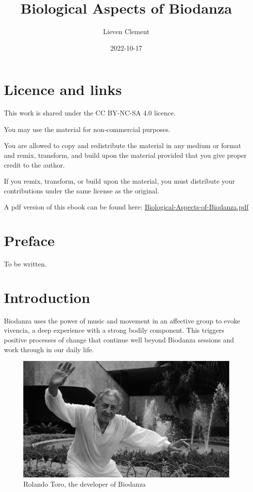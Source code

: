 \documentclass[
  11pt,
]{book}
\title{Biological Aspects of Biodanza}
\author{Lieven Clement}
\date{2022-10-17}
\begin{document}
\maketitle

{
\hypersetup{linkcolor=}
\setcounter{tocdepth}{2}
\tableofcontents
}
\hypertarget{licence-and-links}{%
\chapter*{Licence and links}\label{licence-and-links}}

This work is shared under the
CC BY-NC-SA 4.0 licence.

You may use the material for non-commercial purposes.

You are allowed to copy and redistribute the material in any medium or format and remix, transform, and build upon the material provided that you give proper credit to the author.

If you remix, transform, or build upon the material, you must distribute your contributions under the same license as the original.

A pdf version of this ebook can be found here: \href{https://biodanzabrugge.be/biologicalAspectsBiodanza/Biological-Aspects-of-Biodanza.pdf}{Biological-Aspects-of-Biodanza.pdf}

\hypertarget{preface}{%
\chapter*{Preface}\label{preface}}

To be written.

\hypertarget{intro}{%
\chapter{Introduction}\label{intro}}

Biodanza uses the power of music and movement in an affective group to evoke vivencia, a deep experience with a strong bodily component. This triggers positive processes of change that continue well beyond Biodanza sessions and work through in our daily life.

\begin{figure}

{\centering \includegraphics[width=0.45\linewidth]{./figs/rolando} 

}

\caption{Rolando Toro, the developer of Biodanza}\label{fig:rolandoToro}
\end{figure}
\end{document}
